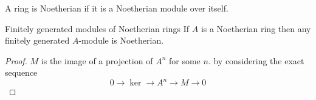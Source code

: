\begin{dfn}
    A ring is Noetherian if it is a Noetherian module over itself.
\end{dfn}

\begin{prop}{Finitely generated modules of Noetherian rings}
    If $A$ is a Noetherian ring then any finitely generated $A$-module is 
    Noetherian.
\end{prop}
\begin{proof}
    $M$ is the image of a projection of $A^n$ for some $n$.
     by considering
    the exact sequence
    \[0 \to \ker \to A^n \to M \to 0\]
\end{proof}


